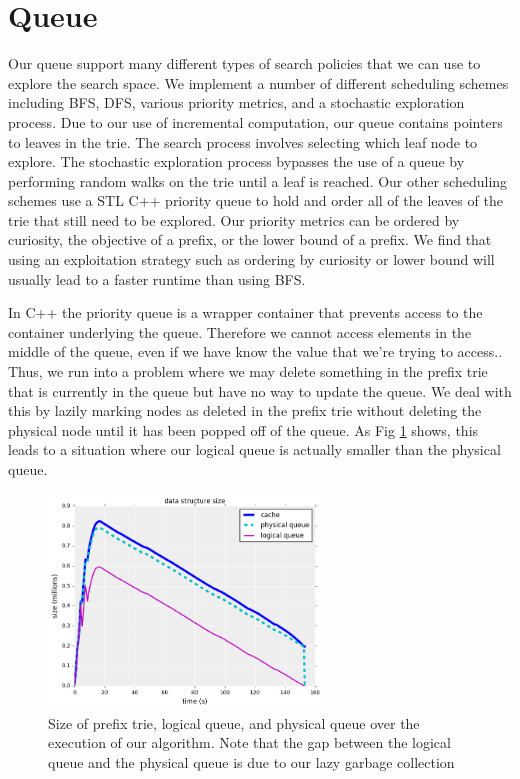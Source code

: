 \documentclass[]{report}
\theoremstyle{definition}
\begin{document}
\section{Queue}\label{sec:queue}
Our queue support many different types of search policies that we can use to explore the search space.
We implement a number of different scheduling schemes including BFS, DFS, various priority metrics, and a stochastic exploration process.
Due to our use of incremental computation, our queue contains pointers to leaves in the trie.
The search process involves selecting which leaf node to explore.
The stochastic exploration process bypasses the use of a queue by performing random walks on the trie until a leaf is reached.
Our other scheduling schemes use a STL C++ priority queue to hold and order all of the leaves of the trie that still need to be explored.
Our priority metrics can be ordered by curiosity, the objective of a prefix, or the lower bound of a prefix.
We find that using an exploitation strategy such as ordering by curiosity or lower bound will usually lead to a faster runtime than using BFS.

In C++ the priority queue is a wrapper container that prevents access to the container underlying the queue.
Therefore we cannot access elements in the middle of the queue, even if we have know the value that we're trying to access..
Thus, we run into a problem where we may delete something in the prefix trie that is currently in the queue but have no way to update the queue.
We deal with this by lazily marking nodes as deleted in the prefix trie without deleting the physical node until it has been popped off of the queue.
As Fig \ref{fig:queue_gc} shows, this leads to a situation where our logical queue is actually smaller than the physical queue.

\begin{figure}[t!]
\begin{center}
\includegraphics[width=0.65\textwidth]{figs/compas-queue-cache-size-insertions.png}
\end{center}
\caption{Size of prefix trie, logical queue, and physical queue over the execution of our algorithm. Note that the gap between the logical queue and the physical queue is due to our lazy garbage collection}
\label{fig:queue_gc}
\end{figure}
\end{document}
